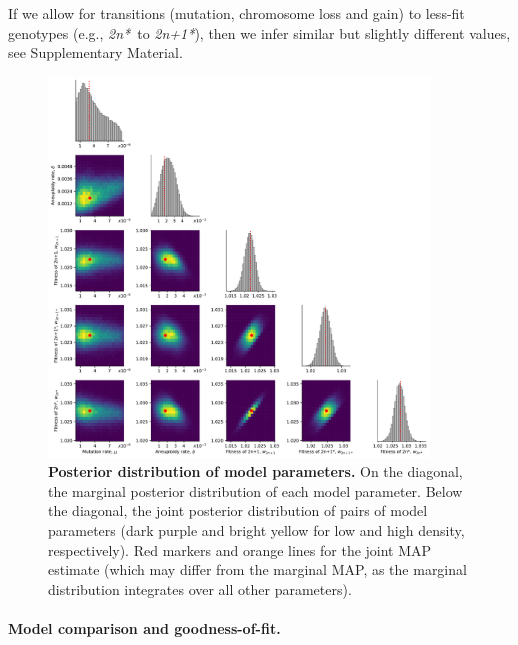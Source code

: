 \documentclass[12pt]{extarticle}
\newcommand{\eumt}{\emph{2n*}}
\newcommand{\anmt}{\emph{2n+1*}}
\begin{document}
If we allow for transitions (mutation, chromosome loss and gain) to less-fit genotypes (e.g., \eumt\ to \anmt), then we infer similar but slightly different values, see Supplementary Material.

\begin{figure}[h]
  \centering
\includegraphics[width=0.9\textwidth]{../figures/posterior.pdf}
  \caption{
  \textbf{Posterior distribution of model parameters.}
On the diagonal, the marginal posterior distribution of each model parameter. 
Below the diagonal, the joint posterior distribution of pairs of model parameters (dark purple and bright yellow for low and high density, respectively). Red markers and orange lines for the joint MAP estimate (which may differ from the marginal MAP, as the marginal distribution integrates over all other parameters).
} 
  \label{fig:posterior}
\end{figure}

\paragraph{Model comparison and goodness-of-fit.}
\end{document}

